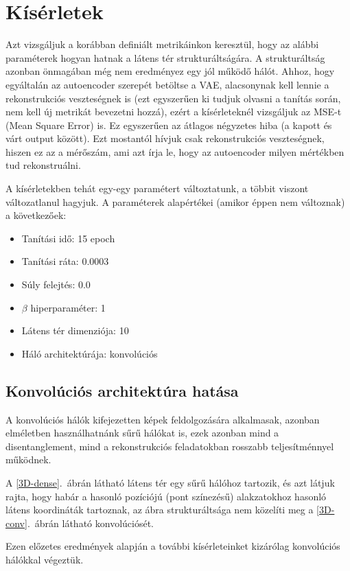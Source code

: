 \section{Kísérletek}

Azt vizsgáljuk a korábban definiált metrikáinkon keresztül, hogy az alábbi paraméterek hogyan hatnak a látens tér strukturáltságára. A strukturáltság azonban önmagában még nem eredményez egy jól működő hálót. Ahhoz, hogy egyáltalán az autoencoder szerepét betöltse a VAE, alacsonynak kell lennie a rekonstrukciós veszteségnek is (ezt egyszerűen ki tudjuk olvasni a tanítás során, nem kell új metrikát bevezetni hozzá), ezért a kísérleteknél vizsgáljuk az MSE-t (Mean Square Error) is. Ez egyszerűen az átlagos négyzetes hiba (a kapott és várt output között). Ezt mostantól hívjuk csak rekonstrukciós veszteségnek, hiszen ez az a mérőszám, ami azt írja le, hogy az autoencoder milyen mértékben tud rekonstruálni.

A kísérletekben tehát egy-egy paramétert változtatunk, a többit viszont változatlanul hagyjuk. A paraméterek alapértékei (amikor éppen nem változnak) a következőek:

\begin{itemize}
  \item Tanítási idő: 15 epoch
  \item Tanítási ráta: 0.0003
  \item Súly felejtés: 0.0
  \item $\beta$ hiperparaméter: 1
  \item Látens tér dimenziója: 10
  \item Háló architektúrája: konvolúciós
\end{itemize}

\subsection{Konvolúciós architektúra hatása}

A konvolúciós hálók kifejezetten képek feldolgozására alkalmasak, azonban elméletben használhatnánk sűrű hálókat is, ezek azonban mind a disentanglement, mind a rekonstrukciós feladatokban rosszabb teljesítménnyel működnek. 

A \ref{3D-dense}.~ábrán látható látens tér egy sűrű hálóhoz tartozik, és azt látjuk rajta, hogy habár a hasonló pozíciójú (pont színezésű) alakzatokhoz hasonló látens koordináták tartoznak, az ábra strukturáltsága nem közelíti meg a \ref{3D-conv}.~ábrán látható konvolúciósét.

Ezen előzetes eredmények alapján a további kísérleteinket kizárólag konvolúciós hálókkal végeztük.

